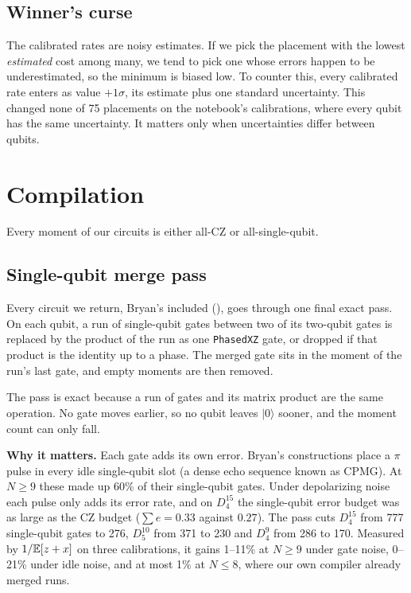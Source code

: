 \documentclass[11pt]{scrartcl}
\newcommand{\ket}[1]{\lvert #1\rangle}
\newcommand{\D}[2]{D^{#1}_{#2}}
\newcommand{\CZ}{\ensuremath{\mathrm{CZ}}}
\begin{document}
\subsection{Winner's curse}

The calibrated rates are noisy estimates. If we pick the placement with the lowest \emph{estimated}
cost among many, we tend to pick one whose errors happen to be underestimated, so the minimum is
biased low. To counter this, every calibrated rate enters as value $+1\sigma$, its estimate plus one
standard uncertainty. This changed none of 75 placements on the notebook's calibrations, where every
qubit has the same uncertainty. It matters only when uncertainties differ between qubits.

\section{Compilation}\label{sec:compile}

Every moment of our circuits is either all-\CZ{} or all-single-qubit.

\subsection{Single-qubit merge pass}

Every circuit we return, Bryan's included (), goes through one final exact pass. On
each qubit, a run of single-qubit gates between two of its two-qubit gates is replaced by the
product of the run as one \texttt{PhasedXZ} gate, or dropped if that product is the identity up to a
phase. The merged gate sits in the moment of the run's last gate, and empty moments are then
removed.

The pass is exact because a run of gates and its matrix product are the same operation. No gate
moves earlier, so no qubit leaves $\ket0$ sooner, and the moment count can only fall.

\textbf{Why it matters.} Each gate adds its own error. Bryan's constructions place a $\pi$ pulse in
every idle single-qubit slot (a dense echo sequence known as CPMG). At $N\ge9$ these made up 60\% of
their single-qubit gates. Under depolarizing noise each pulse only adds its error rate, and on
$\D{15}4$ the single-qubit error budget was as large as the \CZ{} budget ($\sum e=0.33$ against
$0.27$). The pass cuts $\D{15}4$ from 777 single-qubit gates to 276, $\D{10}5$ from 371 to 230 and
$\D94$ from 286 to 170. Measured by $1/\mathbb E[z+x]$ on three calibrations, it gains 1--11\% at $N\ge9$
under gate noise, 0--21\% under idle noise, and at most 1\% at $N\le8$, where our own compiler
already merged runs.
\end{document}
